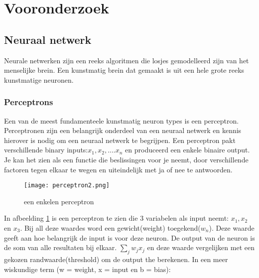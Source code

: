 \section{Vooronderzoek}

\subsection{Neuraal netwerk}
Neurale netwerken zijn een reeks algoritmen die losjes gemodelleerd zijn van het menselijke brein. Een kunstmatig brein dat gemaakt is uit een hele grote reeks kunstmatige neuronen.

\subsubsection{Perceptrons}
Een van de meest fundamenteele kunstmatig neuron types is een perceptron.\cite{Perceptron1} Perceptronen zijn een belangrijk onderdeel van een neuraal netwerk en kennis hierover is nodig om een neuraal netwerk te begrijpen. Een perceptron pakt verschillende binary inputs:$x_{1}, x_{2},....x_{n}$ en produceerd een enkele binaire output. Je kan het zien als een functie die beslissingen voor je neemt, door verschillende factoren tegen elkaar te wegen en uiteindelijk met ja of nee te antwoorden.
\begin{figure}[h!]
\centering
\texttt{[image: perceptron2.png]}
\caption{een enkelen perceptron}
\label{peceptron2}
\end{figure}
\linebreak
In afbeelding \ref{peceptron2} is een perceptron te zien die 3 variabelen als input neemt: $x_{1}, x_{2}$ en $x_{3}.$ Bij all deze waardes word een gewicht(weight) toegekend($w_{n}$). Deze waarde geeft aan hoe belangrijk de input is voor deze neuron. De output van de neuron is de som van alle resultaten bij elkaar. $\sum_{j}w_{j}x_{j}$ en deze waarde vergelijken met een gekozen randwaarde(threshold) om de output the berekenen. In een meer wiskundige term (w = weight, x = input en b = bias):

